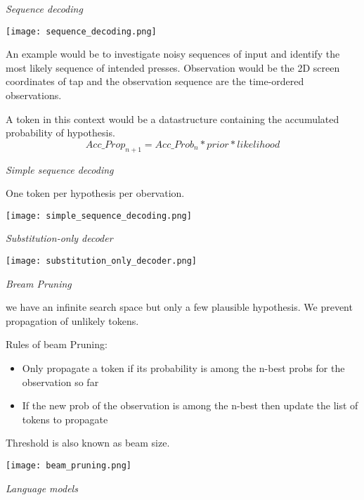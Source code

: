 \textit{Sequence decoding} \smallskip

\begin{center}
	\texttt{[image: sequence\_decoding.png]}
\end{center}

An example would be to investigate noisy sequences of input and identify the most likely sequence of intended presses.
Observation would be the 2D screen coordinates of tap and the observation sequence are the time-ordered observations. 
\smallskip

A token in this context would be a datastructure containing the accumulated probability of hypothesis. 
$$Acc\_Prop_{n+1} = Acc\_Prob_{n} * prior * likelihood$$


\textit{Simple sequence decoding} \smallskip

One token per hypothesis per obervation. 


\begin{center}
	\texttt{[image: simple\_sequence\_decoding.png]}
\end{center}


\textit{Substitution-only decoder} \smallskip

\begin{center}
	\texttt{[image: substitution\_only\_decoder.png]}
\end{center}

\textit{Bream Pruning} \smallskip

we have an infinite search space but only a few plausible hypothesis. We prevent propagation of unlikely tokens. 

Rules of beam Pruning: 

\begin{itemize}[itemsep=-5pt, topsep=0pt, leftmargin=*]
	\item Only propagate a token if its probability is among the n-best probs for the observation so far 
	\item If the new prob of the observation is among the n-best then update the list of tokens to propagate
\end{itemize}

Threshold is also known as beam size. 

\begin{center}
	\texttt{[image: beam\_pruning.png]}
\end{center}

\textit{Language models} \medskip

